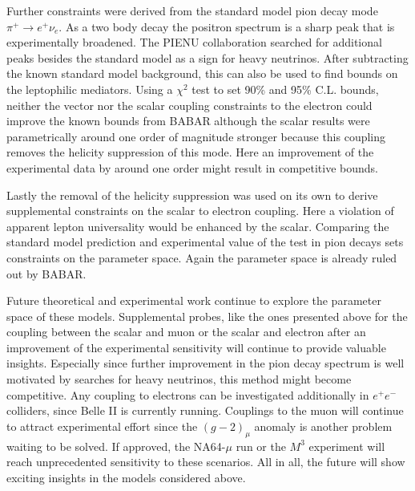 Further constraints were derived from the standard model pion decay mode $\pi^+\rightarrow e^+ \nu_e$. As a two body decay the positron spectrum is a sharp peak that is experimentally broadened. The PIENU collaboration searched for additional peaks besides the standard model as a sign for heavy neutrinos. After subtracting the known standard model background, this can also be used to find bounds on the leptophilic mediators. Using a $\chi^2$ test to set 90\% and 95\% C.L. bounds, neither the vector nor the scalar coupling constraints to the electron could improve the known bounds from BABAR although the scalar results were parametrically around one order of magnitude stronger because this coupling removes the helicity suppression of this mode. Here an improvement of the experimental data by around one order might result in competitive bounds. 

Lastly the removal of the helicity suppression was used on its own to derive supplemental constraints on the scalar to electron coupling. Here a violation of apparent lepton universality would be enhanced by the scalar. Comparing the standard model prediction and experimental value of the test in pion decays sets constraints on the parameter space. Again the parameter space is already ruled out by BABAR. 

Future theoretical and experimental work continue to explore the parameter space of these models. Supplemental probes, like the ones presented above for the coupling between the scalar and muon or the scalar and electron after an improvement of the experimental sensitivity will continue to provide valuable insights. Especially since further improvement in the pion decay spectrum is well motivated by searches for heavy neutrinos, this method might become competitive. Any coupling to electrons can be investigated additionally in $e^+e^-$ colliders, since Belle II is currently running.
Couplings to the muon will continue to attract experimental effort since the $(g-2)_\mu$ anomaly is another problem waiting to be solved. If approved, the NA64-$\mu$ run or the $M^3$ experiment will reach unprecedented sensitivity to these scenarios.
All in all, the future will show exciting insights in the models considered above.